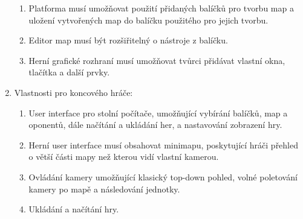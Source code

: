 \begin{enumerate}
\begin{enumerate}
			\item Platforma musí umožňovat použití přidaných balíčků pro tvorbu map a uložení vytvořených map do balíčku použitého pro jejich tvorbu.
			\item Editor map musí být rozšiřitelný o nástroje z balíčku.
			\item Herní grafické rozhraní musí umožňovat tvůrci přidávat vlastní okna, tlačítka a další prvky.
		\end{enumerate}
	\item Vlastnosti pro koncového hráče:
		\begin{enumerate}
			\item User interface pro stolní počítače, umožňující vybírání balíčků, map a oponentů, dále načítání a ukládání her, a nastavování zobrazení hry.
			\item Herní user interface musí obsahovat minimapu, poskytující hráči přehled o větší části mapy než kterou vidí vlastní kamerou.
			\item Ovládání kamery umožňující klasický top-down pohled, volné poletování kamery po mapě a následování jednotky.
			\item Ukládání a načítání hry.
		\end{enumerate}
\end{enumerate}
